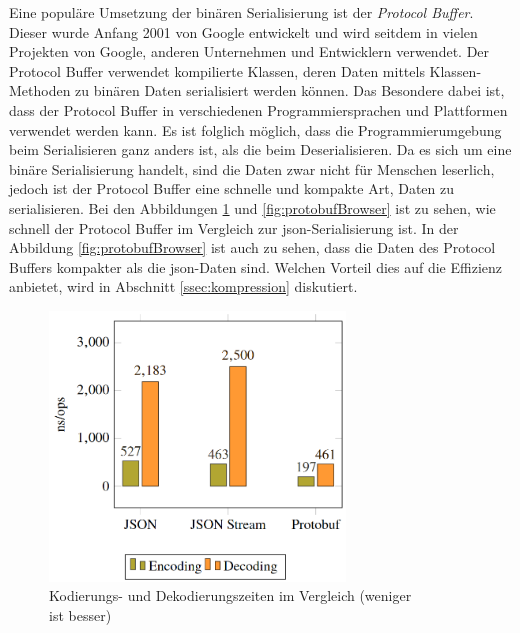 Eine populäre Umsetzung der binären Serialisierung ist der \textit{Protocol Buffer}. Dieser wurde Anfang 2001 von Google entwickelt und wird seitdem in vielen Projekten von Google, anderen Unternehmen und Entwicklern verwendet. Der Protocol Buffer verwendet kompilierte Klassen, deren Daten mittels Klassen-Methoden zu binären Daten serialisiert werden können. Das Besondere dabei ist, dass der Protocol Buffer in verschiedenen Programmiersprachen und Plattformen verwendet werden kann. Es ist folglich möglich, dass die Programmierumgebung beim Serialisieren ganz anders ist, als die beim Deserialisieren. Da es sich um eine binäre Serialisierung handelt, sind die Daten zwar nicht für Menschen leserlich, jedoch ist der Protocol Buffer eine schnelle und kompakte Art, Daten zu serialisieren. Bei den Abbildungen \ref{fig:protobufTime} und \ref{fig:protobufBrowser} ist zu sehen, wie schnell der Protocol Buffer im Vergleich zur \ac{json}-Serialisierung ist.  In der Abbildung \ref{fig:protobufBrowser} ist auch zu sehen, dass die Daten des Protocol Buffers kompakter als die \ac{json}-Daten sind. Welchen Vorteil dies auf die Effizienz anbietet, wird in Abschnitt \ref{ssec:kompression} diskutiert.\cite{currier2022protocol}

\begin{figure}[htp]
    \centering
    \includegraphics[width=0.7\textwidth]{images/protobuf_time.png}
    \caption{Kodierungs- und Dekodierungszeiten im Vergleich (weniger\\ ist besser)\cite{currier2022protocol}}
    \label{fig:protobufTime}
\end{figure}

